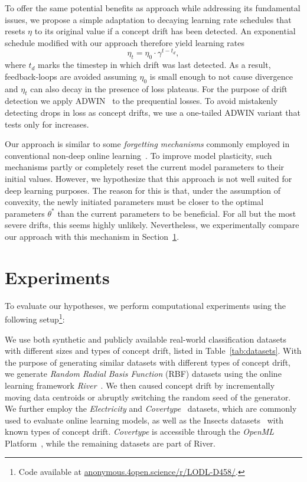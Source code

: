 \documentclass[runningheads]{llncs}
\begin{document}
To offer the same potential benefits as \textcite{kunchevaAdaptiveLearningRate2008} approach while addressing its fundamental issues, we propose a simple adaptation to decaying learning rate schedules that resets $\eta$ to its original value if a concept drift has been detected.
An exponential schedule modified with our approach therefore yield learning rates
\begin{equation}
	\eta_t = \eta_0 \cdot \gamma^{t-t_d},
\end{equation}\label{eq:drift_reset}
where $t_d$ marks the timestep in which drift was last detected.
As a result, feedback-loops are avoided assuming $\eta_0$ is small enough to not cause divergence and $\eta_t$ can also decay in the presence of loss plateaus.
For the purpose of drift detection we apply ADWIN~\cite{bifetLearningTimeChangingData2007} to the prequential losses.
To avoid mistakenly detecting drops in loss as concept drifts, we use a one-tailed ADWIN variant that tests only for increases.

Our approach is similar to some \textit{forgetting mechanisms} commonly employed in conventional non-deep online learning~\cite{gamaSurveyConceptDrift2014}.
To improve model plasticity, such mechanisms partly or completely reset the current model parameters to their initial values.
However, we hypothesize that this approach is not well suited for deep learning purposes.
The reason for this is that, under the assumption of convexity, the newly initiated parameters must be closer to the optimal parameters $\theta^*$ than the current parameters to be beneficial.
For all but the most severe drifts, this seems highly unlikely.
Nevertheless, we experimentally compare our approach with this mechanism in Section~\ref{sec:experiments}.

\section{Experiments}\label{sec:experiments}

To evaluate our hypotheses, we perform computational experiments using the following setup\footnote[2]{Code available at \url{anonymous.4open.science/r/LODL-D458/}.}:

We use both synthetic and publicly available real-world classification datasets with different sizes and types of concept drift, listed in Table~\ref{tab:datasets}.
With the purpose of generating similar datasets with different types of concept drift, we generate \textit{Random Radial Basis Function} (RBF) datasets using the online learning framework \textit{River}~\cite{montiel2021river}.
We then caused concept drift by incrementally moving data centroids or abruptly switching the random seed of the generator.
We further employ the \textit{Electricity} and \textit{Covertype}~\cite{misc_covertype_31} datasets, which are commonly used to evaluate online learning models, as well as the Insects datasets~\cite{souzaChallengesBenchmarkingStream2020} with known types of concept drift.
\textit{Covertype} is accessible through the \textit{OpenML} Platform~\cite{vanschorenOpenMLNetworkedScience2014}, while the remaining datasets are part of River.
\end{document}
